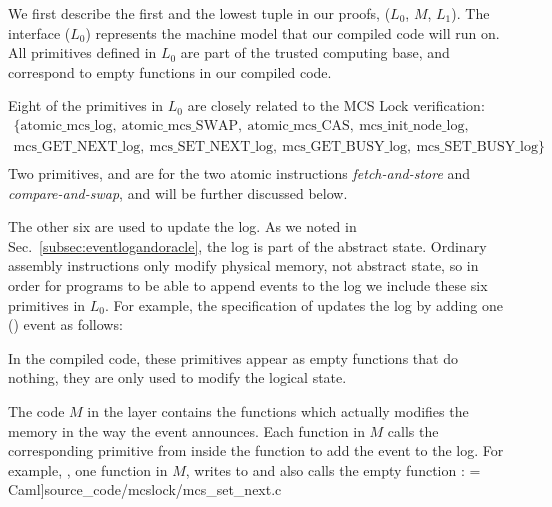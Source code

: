 We first describe the first and the lowest tuple in our proofs, ($L_0$, $M$, $L_1$).
The interface ($L_0$) represents the machine model that our compiled code will run on.
All primitives defined in $L_0$ are part of the trusted computing base, and correspond to empty functions in our compiled code.

Eight of the primitives in $L_0$  are closely related to the MCS Lock verification:
$$
\begin{array}{c}
\{\mathrm{atomic\_mcs\_log},\ \mathrm{atomic\_mcs\_SWAP},\ \mathrm{atomic\_mcs\_CAS},\ \mathrm{mcs\_init\_node\_log},\\
\mathrm{mcs\_GET\_NEXT\_log},\ \mathrm{mcs\_SET\_NEXT\_log},\ \mathrm{mcs\_GET\_BUSY\_log},\ \mathrm{mcs\_SET\_BUSY\_log}\} \\
\end{array}
$$
Two primitives,  and  are for the two atomic instructions {\em fetch-and-store} and {\em compare-and-swap}, and will be further discussed below.

The other six are used to update the log.  As we noted in
Sec.~\ref{subsec:eventlogandoracle}, the log is part of the abstract
state. Ordinary assembly instructions only modify physical memory, not
abstract state, so in order for programs to be able to append events to
the log we include these six primitives in $L_0$. 
For example, the specification of  updates the log by adding one () event as follows:
 
In the compiled code, these primitives appear as empty functions that do nothing, they are only used to modify the logical state.


The code $M$ in the layer contains the 
functions which actually modifies the memory in the way the event announces.
Each function in $M$ calls the corresponding primitive from
 inside the function to add the event to the log.
For example, , one function in $M$, writes
to  and also calls
the empty function :
 = Caml]{source_code/mcslock/mcs_set_next.c}

